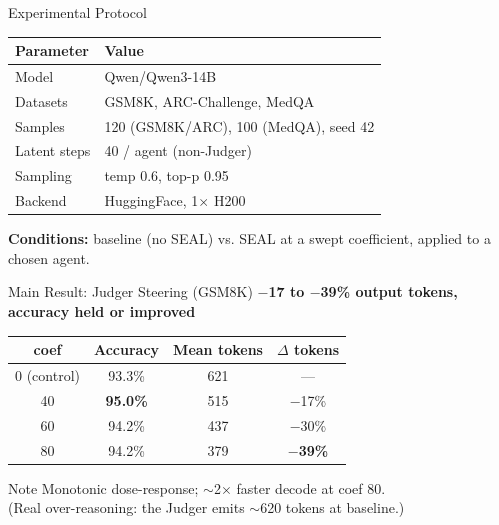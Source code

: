 \documentclass{beamer}
\begin{document}
\begin{frame}{Experimental Protocol}
    \begin{table}[]
        \centering
        \begin{tabular}{|l|l|}
            \hline
            \textbf{Parameter} & \textbf{Value} \\ \hline
            Model & Qwen/Qwen3-14B \\ \hline
            Datasets & GSM8K, ARC-Challenge, MedQA \\ \hline
            Samples & 120 (GSM8K/ARC), 100 (MedQA), seed 42 \\ \hline
            Latent steps & 40 / agent (non-Judger) \\ \hline
            Sampling & temp 0.6, top-p 0.95 \\ \hline
            Backend & HuggingFace, 1$\times$ H200 \\ \hline
        \end{tabular}
    \end{table}
    \vspace{0.2cm}
    \textbf{Conditions:} baseline (no SEAL) vs. SEAL at a swept coefficient, applied to a chosen agent.
\end{frame}

\begin{frame}{Main Result: Judger Steering (GSM8K)}
    \textbf{$-$17 to $-$39\% output tokens, accuracy held or improved}
    \vspace{0.2cm}
    \begin{table}[]
        \centering
        \begin{tabular}{|c|c|c|c|}
            \hline
            \textbf{coef} & \textbf{Accuracy} & \textbf{Mean tokens} & \textbf{$\Delta$ tokens} \\ \hline
            0 (control) & 93.3\% & 621 & --- \\ \hline
            40 & \textbf{95.0\%} & 515 & $-$17\% \\ \hline
            60 & 94.2\% & 437 & $-$30\% \\ \hline
            80 & 94.2\% & 379 & \textbf{$-$39\%} \\ \hline
        \end{tabular}
    \end{table}
    \vspace{0.2cm}
    \begin{block}{Note}
        Monotonic dose-response; $\sim$2$\times$ faster decode at coef 80. \\
        (Real over-reasoning: the Judger emits $\sim$620 tokens at baseline.)
    \end{block}
\end{frame}
\end{document}
